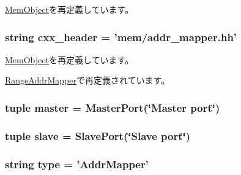 \hyperlink{classMemObject_1_1MemObject_a17fa61ac3806b481cafee5593b55e5d0}{MemObject}を再定義しています。\hypertarget{classAddrMapper_1_1AddrMapper_a17da7064bc5c518791f0c891eff05fda}{
\subsubsection[{cxx\_\-header}]{\setlength{\rightskip}{0pt plus 5cm}string {\bf cxx\_\-header} = 'mem/addr\_\-mapper.hh'}}
\label{classAddrMapper_1_1AddrMapper_a17da7064bc5c518791f0c891eff05fda}


\hyperlink{classMemObject_1_1MemObject_a17da7064bc5c518791f0c891eff05fda}{MemObject}を再定義しています。

\hyperlink{classAddrMapper_1_1RangeAddrMapper_a17da7064bc5c518791f0c891eff05fda}{RangeAddrMapper}で再定義されています。\hypertarget{classAddrMapper_1_1AddrMapper_a0f74d64e6817f0f89bafc52ff3c56cbb}{
\subsubsection[{master}]{\setlength{\rightskip}{0pt plus 5cm}tuple {\bf master} = {\bf MasterPort}(\char`\"{}Master port\char`\"{})}}
\label{classAddrMapper_1_1AddrMapper_a0f74d64e6817f0f89bafc52ff3c56cbb}
\hypertarget{classAddrMapper_1_1AddrMapper_a9b8cb1f697e86858437a78f041478c9b}{
\subsubsection[{slave}]{\setlength{\rightskip}{0pt plus 5cm}tuple {\bf slave} = {\bf SlavePort}(\char`\"{}Slave port\char`\"{})}}
\label{classAddrMapper_1_1AddrMapper_a9b8cb1f697e86858437a78f041478c9b}
\hypertarget{classAddrMapper_1_1AddrMapper_acce15679d830831b0bbe8ebc2a60b2ca}{
\subsubsection[{type}]{\setlength{\rightskip}{0pt plus 5cm}string {\bf type} = '{\bf AddrMapper}'}}
\label{classAddrMapper_1_1AddrMapper_acce15679d830831b0bbe8ebc2a60b2ca}


